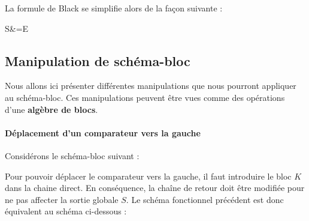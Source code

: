 \begin{center}
\end{center}

La formule de Black se simplifie alors de la façon suivante :
\begin{bequation}
    S&=E
\end{bequation}

\newpage

\subsection{Manipulation de schéma-bloc}
Nous allons ici présenter différentes manipulations que nous
pourront appliquer au schéma-bloc. Ces manipulations peuvent
être vues comme des opérations d'une \textbf{algèbre de blocs}.

\paragraph{Déplacement d'un comparateur vers la gauche}

Considérons le schéma-bloc suivant :
\begin{center}
\end{center}

Pour pouvoir déplacer le comparateur vers la gauche, 
il faut introduire le bloc $K$ dans la chaine direct.
En conséquence, la chaîne de retour doit être modifiée pour ne pas affecter la sortie globale $S$.
Le schéma fonctionnel précédent est donc équivalent au schéma ci-dessous :

